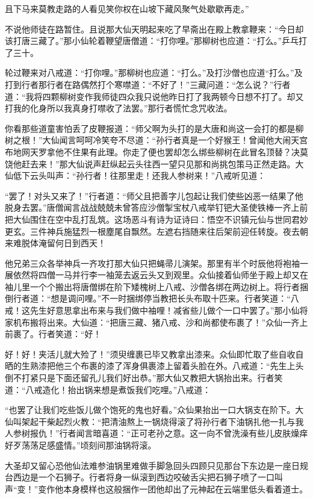 \documentclass[12pt,UTF8]{ctexbook}
\begin{document}
且下马来莫教走路的人看见笑你权在山坡下藏风聚气处歇歇再走。”

不说他师徒在路暂住。且说那大仙天明起来吃了早斋出在殿上教拿鞭来：“今日却该打唐三藏了。”那小仙轮着鞭望唐僧道：“打你哩。”那柳树也应道：“打么。”乒乓打了三十。

轮过鞭来对八戒道：“打你哩。”那柳树也应道：“打么。”及打沙僧也应道“打么。”及打到行者那行者在路偶然打个寒噤道：“不好了！”三藏问道：“怎么说？”行者道：“我将四颗柳树变作我师徒四众我只说他昨日打了我两顿今日想不打了。却又打我的化身所以我真身打噤收了法罢。”那行者慌忙念咒收法。

你看那些道童害怕丢了皮鞭报道：“师父啊为头打的是大唐和尚这一会打的都是柳树之根！”大仙闻言呵呵冷笑夸不尽道：“孙行者真是一个好猴王！曾闻他大闹天宫布地网天罗拿他不住果有此理。你走了便也罢却怎么绑些柳树在此冒名顶替？决莫饶他赶去来！”那大仙说声赶纵起云头往西一望只见那和尚挑包策马正然走路。大仙低下云头叫声：“孙行者！往那里走！还我人参树来！”八戒听见道：

“罢了！对头又来了！”行者道：“师父且把善字儿包起让我们使些凶恶一结果了他脱身去罢。”唐僧闻言战战兢兢未曾答应沙僧掣宝杖八戒举钉钯大圣使铁棒一齐上前把大仙围住在空中乱打乱筑。这场恶斗有诗为证诗曰：悟空不识镇元仙与世同君妙更玄。三件神兵施猛烈一根塵尾自飘然。左遮右挡随来往后架前迎任转旋。夜去朝来难脱体淹留何日到西天！

他兄弟三众各举神兵一齐攻打那大仙只把蝇帚儿演架。那里有半个时辰他将袍袖一展依然将四僧一马并行李一袖笼去返云头又到观里。众仙接着仙师坐于殿上却又在袖儿里一个个搬出将唐僧绑在阶下矮槐树上八戒、沙僧各绑在两边树上。将行者捆倒行者道：“想是调问哩。”不一时捆绑停当教把长头布取十匹来。行者笑道：“八戒！这先生好意思拿出布来与我们做中袖哩！减省些儿做个一口中罢了。”那小仙将家机布搬将出来。大仙道：“把唐三藏、猪八戒、沙和尚都使布裹了！”众仙一齐上前裹了。行者笑道：“好！

好！好！夹活儿就大殓了！”须臾缠裹已毕又教拿出漆来。众仙即忙取了些自收自晒的生熟漆把他三个布裹的漆了浑身俱裹漆上留着头脸在外。八戒道：“先生上头倒不打紧只是下面还留孔儿我们好出恭。”那大仙又教把大锅抬出来。行者笑道：“八戒造化！抬出锅来想是煮饭我们吃哩。”八戒道：

“也罢了让我们吃些饭儿做个饱死的鬼也好看。”众仙果抬出一口大锅支在阶下。大仙叫架起干柴起烈火教：“把清油熬上一锅烧得滚了将孙行者下油锅扎他一扎与我人参树报仇！”行者闻言暗喜道：“正可老孙之意。这一向不曾洗澡有些儿皮肤燥痒好歹荡荡足感盛情。”顷刻间那油锅将滚。

大圣却又留心恐他仙法难参油锅里难做手脚急回头四顾只见那台下东边是一座日规台西边是一个石狮子。行者将身一纵滚到西边咬破舌尖把石狮子喷了一口叫声“变！”变作他本身模样也这般捆作一团他却出了元神起在云端里低头看着道士。
\end{document}

